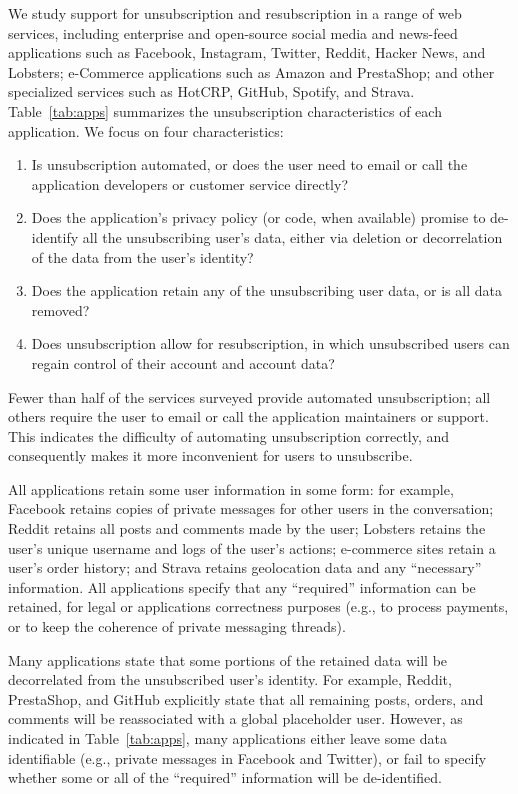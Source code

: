 We study support for unsubscription and resubscription in a range of web
services, including enterprise and open-source social media and news-feed applications such as
Facebook, Instagram, Twitter, Reddit, Hacker News, and Lobsters; e-Commerce applications such as
Amazon and PrestaShop; and other specialized services such as HotCRP, GitHub, Spotify, and Strava.
Table~\ref{tab:apps} summarizes the unsubscription characteristics of each application. We focus on
four characteristics: 
\begin{enumerate}
    \item Is unsubscription automated, or does the user need to email or call the
application developers or customer service directly? 
    \item Does the application's privacy policy (or
        code, when available) promise to de-identify all the unsubscribing user's data, 
        either via deletion or
        decorrelation of the data from the user's identity? 
    \item Does the application retain any of the unsubscribing user data, or is all data removed?
    \item Does unsubscription allow for resubscription, in which unsubscribed users can regain control of their
        account and account data?
\end{enumerate}

Fewer than half of the services surveyed provide automated unsubscription; all others require the
user to email or call the application maintainers or support. This indicates the difficulty of
automating unsubscription correctly, and consequently makes it more  
inconvenient for users to unsubscribe.

All applications retain some user information in some form: for example, Facebook retains copies of
private messages for other users in the conversation; Reddit retains all posts and comments made by
the user; Lobsters retains the user's unique username and logs of the user's actions; e-commerce
sites retain a user's order history; and Strava retains geolocation data and any
``necessary'' information. All applications specify that any
``required'' information can be retained, for legal or applications correctness purposes (e.g., to
process payments, or to keep the coherence of private messaging threads).

Many applications state that some portions of the retained data will be decorrelated from the
unsubscribed user's identity. For example, Reddit, PrestaShop, and GitHub explicitly state that all
remaining posts, orders, and comments will be reassociated with a global placeholder user.
However, as indicated in Table~\ref{tab:apps}, many applications either leave some data identifiable
(e.g., private messages in Facebook and Twitter), or fail to specify whether some or all of the ``required''
information will be de-identified.

